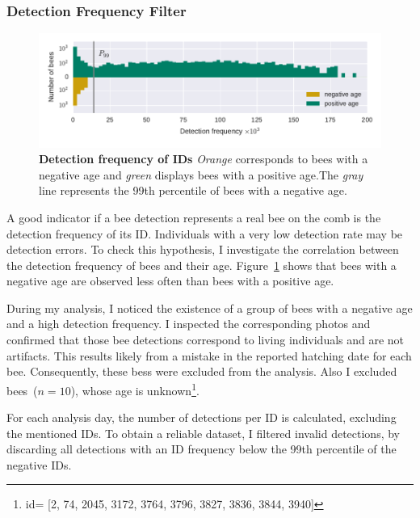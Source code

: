 \subsubsection{Detection Frequency Filter}
\label{subsubsec:dataset:filter}
\begin{figure}[t]
	\centering
	\includegraphics[width=1.0\textwidth]{Figures/filter}
	\caption[Detection frequency of IDs]{\textbf{Detection frequency of IDs} \emph{Orange} corresponds to bees with a negative age and \emph{green} displays bees with a positive age.\protect\footnotemark The \emph{gray} line represents the 99th percentile of bees with a negative age.}
	\label{fig:filter}
\end{figure}

A good indicator if a bee detection represents a real bee on the comb is the detection frequency of its ID.
Individuals with a very low detection rate may be detection errors.
To check this hypothesis, I investigate the correlation between the detection frequency of bees and their age.
Figure~\ref{fig:filter} shows that bees with a negative age are
observed less often than bees with a positive age.

During my analysis, I noticed the existence of a group of bees with a negative age and a high detection frequency.
I inspected the corresponding photos and confirmed that those bee detections correspond to living individuals and are not artifacts.
This results likely from a mistake in the reported hatching date for each bee.
Consequently, these bess were excluded from the analysis. Also I excluded bees~($n=10$), whose age is unknown\footnote{id= [2,
    74,
    2045,
    3172,
    3764,
    3796,
    3827,
    3836,
    3844,
    3940]}.

For each analysis day, the number of detections per ID is calculated, excluding the mentioned IDs.
To obtain a reliable dataset, I filtered invalid detections, by discarding all detections with an ID frequency below the 99th percentile of the negative IDs.


